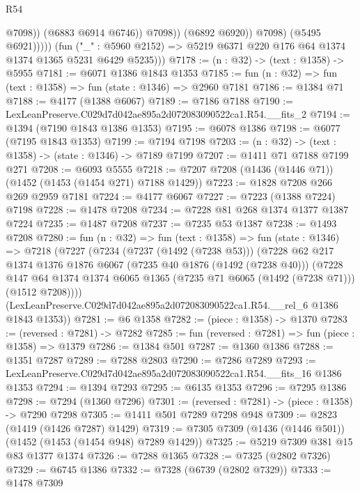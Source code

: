 \begin{lexlean}{R54}
\begin{coremodule}
                              @7098))
                          (@6883 @6914 @6746))
                        @7098))
                    (@6892 @6920))
                  @7098)
                (@5495 @6921)))))
        (fun ("_" : @5960 @2152) => @5219 @6371 @220 @176 @64 @1374 @1374 @1365 @5231 @6429 @5235)))
@7178 := (n : @32) -> (text : @1358) -> @5955
@7181 := @6071 @1386 @1843 @1353
@7185 := fun (n : @32) => fun (text : @1358) => fun (state : @1346) => @2960 @7181
@7186 := @1384 @71
@7188 := @4177 (@1388 @6067)
@7189 := @7186 @7188
@7190 := LexLeanPreserve.C029d7d042ae895a2d072083090522ca1.R54.__fits_2
@7194 := @1394 (@7190 @1843 @1386 @1353)
@7195 := @6078 @1386
@7198 := @6077 (@7195 @1843 @1353)
@7199 := @7194 @7198
@7203 := (n : @32) -> (text : @1358) -> (state : @1346) -> @7189 @7199
@7207 := @1411 @71 @7188 @7199 @271
@7208 := @6093 @5555
@7218 := @7207 @7208 (@1436 (@1446 @71)) (@1452 (@1453 (@1454 @271) @7188 @1429))
@7223 := @1828 @7208 @266 @269 @2959 @7181
@7224 := @4177 @6067
@7227 := @7223 (@1388 @7224) @7198
@7228 := @1478 @7208
@7234 := @7228 @81 @268 @1374 @1377 @1387 @7224
@7235 := @1487 @7208
@7237 := @7235 @53 @1387
@7238 := @1493 @7208
@7280 := fun (n : @32) =>
  fun (text : @1358) =>
  fun (state : @1346) =>
  @7218
    (@7227
      (@7234
        (@7237 (@1492 (@7238 @53)))
        (@7228
          @62
          @217
          @1374
          @1376
          @1876
          @6067
          (@7235 @40 @1876 (@1492 (@7238 @40)))
          (@7228
            @147
            @64
            @1374
            @1374
            @6065
            @1365
            (@7235 @71 @6065 (@1492 (@7238 @71)))
            (@1512 @7208))))
      (LexLeanPreserve.C029d7d042ae895a2d072083090522ca1.R54.__rel_6 @1386 @1843 @1353))
@7281 := @6 @1358
@7282 := (piece : @1358) -> @1370
@7283 := (reversed : @7281) -> @7282
@7285 := fun (reversed : @7281) => fun (piece : @1358) => @1379
@7286 := @1384 @501
@7287 := @1360 @1386
@7288 := @1351 @7287
@7289 := @7288 @2803
@7290 := @7286 @7289
@7293 := LexLeanPreserve.C029d7d042ae895a2d072083090522ca1.R54.__fits_16 @1386 @1353
@7294 := @1394 @7293
@7295 := @6135 @1353
@7296 := @7295 @1386
@7298 := @7294 (@1360 @7296)
@7301 := (reversed : @7281) -> (piece : @1358) -> @7290 @7298
@7305 := @1411 @501 @7289 @7298 @948
@7309 := @2823 (@1419 (@1426 @7287) @1429)
@7319 := @7305 @7309 (@1436 (@1446 @501)) (@1452 (@1453 (@1454 @948) @7289 @1429))
@7325 := @5219 @7309 @381 @15 @83 @1377 @1374
@7326 := @7288 @1365
@7328 := @7325 (@2802 @7326)
@7329 := @6745 @1386
@7332 := @7328 (@6739 (@2802 @7329))
@7333 := @1478 @7309

\end{coremodule}
\end{lexlean}
